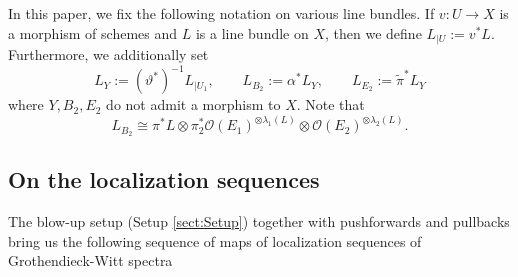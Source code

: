 \documentclass[a4paper]{amsart}
\theoremstyle{plain}
\theoremstyle{definition}
\numberwithin{equation}{section}
\newcommand{\SO}{\mathcal{O}}
\begin{document}
In this paper, we fix the following notation on various line bundles. If $v:U\to X$ is a morphism of schemes and $L$ is a line bundle on $X$, then we define $L_{\mid U}:= v^*L$. Furthermore, we additionally set
$$L_Y := (\vartheta^*)^{-1} L_{\mid U_1}, \quad\quad L_{B_2} := \alpha^*L_Y , \quad\quad L_{E_2} := \tilde{\pi}^*L_Y $$
where $Y,B_2,E_2$ do not admit a morphism to $X$. Note that
\begin{equation}\label{eqn:two_step_blow_up_lambda}
    L_{B_2} \cong \pi^* L \otimes \pi_2^*\SO(E_1)^{\otimes \lambda_1(L)} \otimes \SO(E_2)^{\otimes \lambda_2(L)} .
\end{equation}

\subsection{On the localization sequences}  The blow-up setup (Setup \ref{sect:Setup}) together with pushforwards and pullbacks bring us the following sequence of maps of localization sequences of Grothendieck-Witt spectra
\end{document}
